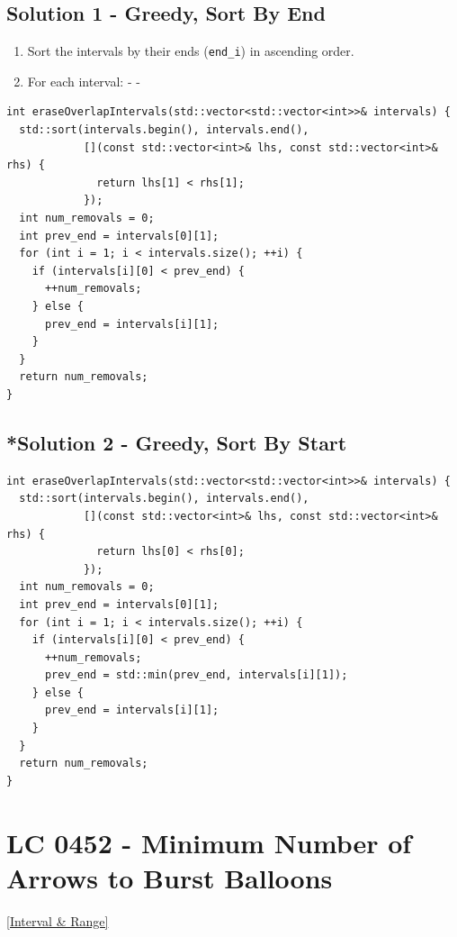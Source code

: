 \subsection*{Solution 1 - Greedy, Sort By End}
\begin{enumerate}
\item Sort the intervals by their ends ({\colorbox{CodeBackground}{\lstinline|end_i|}}) in ascending order.
\item For each interval:
  \subitem - {\color{magenta}{If the current interval overlap with the previous one, remove the current interval and continue to the next one.}}
  \subitem - {\color{magenta}{If the current interval doesn't overlap with the previous one, continue to the next interval.}}
\end{enumerate}
\begin{lstlisting}
int eraseOverlapIntervals(std::vector<std::vector<int>>& intervals) {
  std::sort(intervals.begin(), intervals.end(),
            [](const std::vector<int>& lhs, const std::vector<int>& rhs) {
              return lhs[1] < rhs[1];
            });
  int num_removals = 0;
  int prev_end = intervals[0][1];
  for (int i = 1; i < intervals.size(); ++i) {
    if (intervals[i][0] < prev_end) {
      ++num_removals;
    } else {
      prev_end = intervals[i][1];
    }
  }
  return num_removals;
}
\end{lstlisting}

\subsection*{*Solution 2 - Greedy, Sort By Start}
\begin{lstlisting}
int eraseOverlapIntervals(std::vector<std::vector<int>>& intervals) {
  std::sort(intervals.begin(), intervals.end(),
            [](const std::vector<int>& lhs, const std::vector<int>& rhs) {
              return lhs[0] < rhs[0];
            });
  int num_removals = 0;
  int prev_end = intervals[0][1];
  for (int i = 1; i < intervals.size(); ++i) {
    if (intervals[i][0] < prev_end) {
      ++num_removals;
      prev_end = std::min(prev_end, intervals[i][1]);
    } else {
      prev_end = intervals[i][1];
    }
  }
  return num_removals;
}
\end{lstlisting}

\section{LC 0452 - Minimum Number of Arrows to Burst Balloons}\label{lc0452}
\hyperref[sec:interval_range]{[Interval \& Range]}\\

